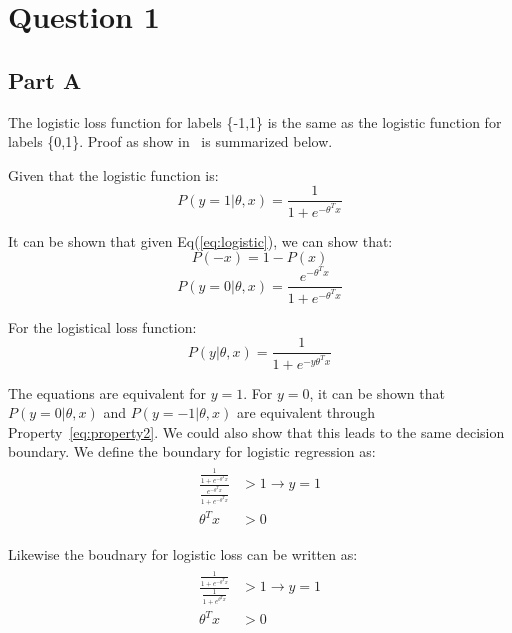 \documentclass[11pt]{article}
\begin{document}
\section*{Question 1}
\subsection*{Part A}

The logistic loss function for labels \{-1,1\} is the same as the logistic function for labels \{0,1\}. 
Proof as show in~\cite{logisticloss} is summarized below.

Given that the logistic function is:
\begin{equation}
		P(y=1 | \theta, x) = \frac{1}{1+e^{-\theta^Tx}}
		\label{eq:logistic}
\end{equation}

It can be shown that given Eq(\ref{eq:logistic}), we can show that: 
\begin{equation}
		P(-x) = 1 - P(x)
\label{eq:property2}
\end{equation}
\begin{equation}
		P(y=0 | \theta, x) = \frac{e^{-\theta^Tx}}{1+e^{-\theta^Tx}}
\end{equation}

For the logistical loss function:
\begin{equation}
		P(y | \theta, x) = \frac{1}{1+e^{-y\theta^Tx}}
		\label{eq:loss}
\end{equation}

The equations are equivalent for $y=1$. For $y=0$, it can be shown that $P(y=0|\theta, x)$ and 
$P(y=-1|\theta,x)$ are equivalent through Property~\ref{eq:property2}. We could also show that
this leads to the same decision boundary. We define the boundary for logistic regression as:
\begin{align}
		\begin{split}
				\frac{\frac{1}{1+e^{-\theta^Tx}}}{\frac{e^{-\theta^Tx}}{1+e^{-\theta^Tx}}} &> 1 \rightarrow y=1 \\
		\theta^Tx &> 0 
		\end{split}
\end{align}

Likewise the boudnary for logistic loss can be written as:
\begin{align}
		\begin{split}
				\frac{\frac{1}{1+e^{-\theta^Tx}}}{\frac{1}{1+e^{\theta^Tx}}} &> 1 \rightarrow y=1 \\
		\theta^Tx &> 0
		\end{split}
\end{align}
\end{document}

